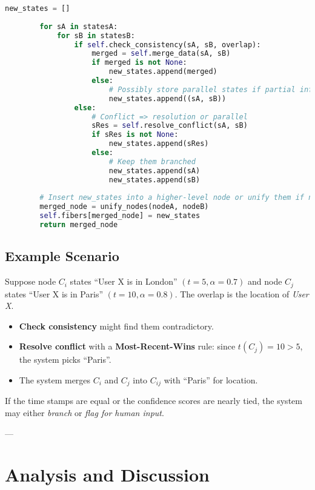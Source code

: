 \documentclass{article}
\begin{document}
\begin{lstlisting}[language=Python, caption=Fibered-Sheaf Merge Protocol in Pythonic Pseudocode, label=lst:python_impl]
        new_states = []
        
        for sA in statesA:
            for sB in statesB:
                if self.check_consistency(sA, sB, overlap):
                    merged = self.merge_data(sA, sB)
                    if merged is not None:
                        new_states.append(merged)
                    else:
                        # Possibly store parallel states if partial info
                        new_states.append((sA, sB))  
                else:
                    # Conflict => resolution or parallel
                    sRes = self.resolve_conflict(sA, sB)
                    if sRes is not None:
                        new_states.append(sRes)
                    else:
                        # Keep them branched
                        new_states.append(sA)
                        new_states.append(sB)
        
        # Insert new_states into a higher-level node or unify them if needed
        merged_node = unify_nodes(nodeA, nodeB)
        self.fibers[merged_node] = new_states
        return merged_node
\end{lstlisting}

\subsection{Example Scenario}

Suppose node $C_i$ states “User X is in London” $(t = 5, \alpha = 0.7)$ and node $C_j$ states “User X is in Paris” 
$(t = 10, \alpha = 0.8)$. The overlap is the location of \emph{User X}.

\begin{itemize}
    \item \textbf{Check consistency} might find them contradictory.
    \item \textbf{Resolve conflict} with a \textbf{Most-Recent-Wins} rule: since $t(C_j) = 10 > 5$, the system picks ``Paris''.
    \item The system merges $C_i$ and $C_j$ into $C_{ij}$ with ``Paris'' for location.
\end{itemize}

If the time stamps are equal or the confidence scores are nearly tied, the system may either \emph{branch} 
or \emph{flag for human input}.

---

\section{Analysis and Discussion}
\label{sec:analysis}
\end{document}
